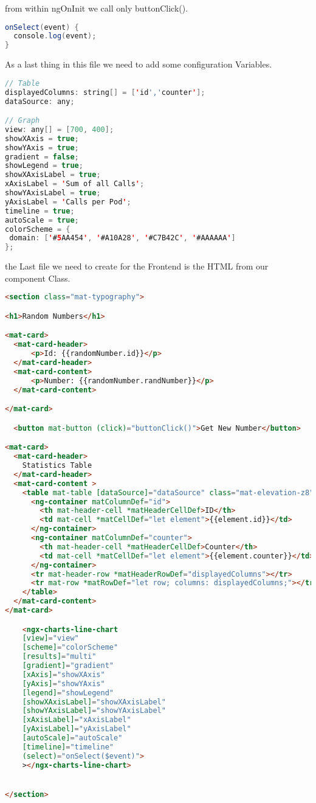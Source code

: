 from within ngOnInit we call only buttonClick().

\begin{lstlisting}[language=Java]
onSelect(event) {
  console.log(event);
}
\end{lstlisting}

As a last thing in this file we need to add some configuration Variables.
\begin{lstlisting}[language=Java]
// Table
displayedColumns: string[] = ['id','counter'];
dataSource: any;

// Graph
view: any[] = [700, 400];
showXAxis = true;
showYAxis = true;
gradient = false;
showLegend = true;
showXAxisLabel = true;
xAxisLabel = 'Sum of all Calls';
showYAxisLabel = true;
yAxisLabel = 'Calls per Pod';
timeline = true;
autoScale = true;
colorScheme = {
 domain: ['#5AA454', '#A10A28', '#C7B42C', '#AAAAAA']
};
\end{lstlisting}

the Last file we need to create for the Frontend is the HTML from our component Class.
\begin{lstlisting}[language=HTML]
<section class="mat-typography">

<h1>Random Numbers</h1>

<mat-card>
  <mat-card-header>
      <p>Id: {{randomNumber.id}}</p>
  </mat-card-header>
  <mat-card-content>
      <p>Number: {{randomNumber.randNumber}}</p>
  </mat-card-content>

</mat-card>

  <button mat-button (click)="buttonClick()">Get New Number</button>

<mat-card>
  <mat-card-header>
    Statistics Table
  </mat-card-header>
  <mat-card-content >
    <table mat-table [dataSource]="dataSource" class="mat-elevation-z8">
      <ng-container matColumnDef="id">
        <th mat-header-cell *matHeaderCellDef>ID</th>
        <td mat-cell *matCellDef="let element">{{element.id}}</td>
      </ng-container>
      <ng-container matColumnDef="counter">
        <th mat-header-cell *matHeaderCellDef>Counter</th>
        <td mat-cell *matCellDef="let element">{{element.counter}}</td>
      </ng-container>
      <tr mat-header-row *matHeaderRowDef="displayedColumns"></tr>
      <tr mat-row *matRowDef="let row; columns: displayedColumns;"></tr>
    </table>
  </mat-card-content>
</mat-card>

    <ngx-charts-line-chart 
    [view]="view"
    [scheme]="colorScheme"
    [results]="multi"
    [gradient]="gradient"
    [xAxis]="showXAxis"
    [yAxis]="showYAxis"
    [legend]="showLegend"
    [showXAxisLabel]="showXAxisLabel"
    [showYAxisLabel]="showYAxisLabel"
    [xAxisLabel]="xAxisLabel"
    [yAxisLabel]="yAxisLabel"
    [autoScale]="autoScale"
    [timeline]="timeline"
    (select)="onSelect($event)">
    ></ngx-charts-line-chart>


</section>
\end{lstlisting}

